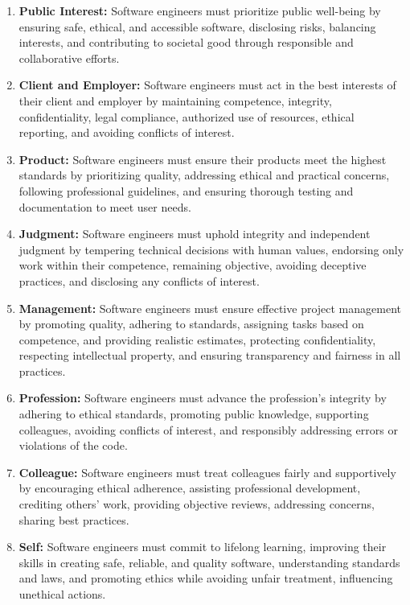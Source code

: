 \begin{enumerate}[itemsep=1ex]
   \item \textbf{Public Interest:} Software engineers must prioritize public well-being by ensuring safe, ethical, and accessible software, disclosing risks, balancing interests, and contributing to societal good through responsible and collaborative efforts.
   \item \textbf{Client and Employer:} Software engineers must act in the best interests of their client and employer by maintaining competence, integrity, confidentiality, legal compliance, authorized use of resources, ethical reporting, and avoiding conflicts of interest.
   \item \textbf{Product:} Software engineers must ensure their products meet the highest standards by prioritizing quality, addressing ethical and practical concerns, following professional guidelines, and ensuring thorough testing and documentation to meet user needs.
   \item \textbf{Judgment:} Software engineers must uphold integrity and independent judgment by tempering technical decisions with human values, endorsing only work within their competence, remaining objective, avoiding deceptive practices, and disclosing any conflicts of interest.
   \item \textbf{Management:} Software engineers must ensure effective project management by promoting quality, adhering to standards, assigning tasks based on competence, and providing realistic estimates, protecting confidentiality, respecting intellectual property, and ensuring transparency and fairness in all practices.
   \item \textbf{Profession:} Software engineers must advance the profession's integrity by adhering to ethical standards, promoting public knowledge, supporting colleagues, avoiding conflicts of interest, and responsibly addressing errors or violations of the code.
   \item \textbf{Colleague:} Software engineers must treat colleagues fairly and supportively by encouraging ethical adherence, assisting professional development, crediting others' work, providing objective reviews, addressing concerns, sharing best practices.
   \item \textbf{Self:} Software engineers must commit to lifelong learning, improving their skills in creating safe, reliable, and quality software, understanding standards and laws, and promoting ethics while avoiding unfair treatment, influencing unethical actions.
\end{enumerate}

